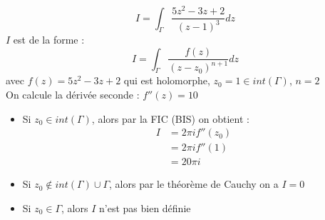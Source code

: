 $$I = \int_{\Gamma} \frac{5z^2-3z+2}{(z-1)^3}dz$$
$I$ est de la forme :
    $$I = \int_{\Gamma} \frac{f(z)}{(z-z_0)^{n+1}}dz$$
avec $f(z) = 5z^2-3z+2$ qui est holomorphe, $z_0 = 1 \in int(\Gamma)$, $n=2$ \\
On calcule la dérivée seconde : $f''(z) =10$
\begin{itemize}
    \item Si $z_0 \in int(\Gamma)$, alors par la FIC (BIS) on obtient :
    \begin{align*}
        I &= 2\pi i f''(z_0) \\
        &= 2\pi i f''(1) \\
        &= 20\pi i
    \end{align*}
    \item Si $z_0 \notin int(\Gamma) \cup \Gamma$, alors par le théorème de Cauchy on a $I = 0$
    \item Si $z_0 \in \Gamma$, alors $I$ n'est pas bien définie
\end{itemize}